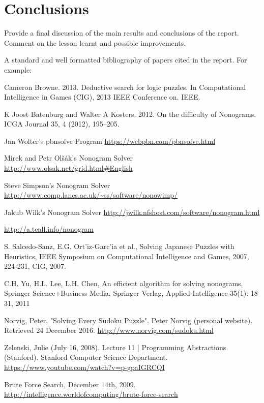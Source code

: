 \documentclass{svproc}
\begin{document}
\section{Conclusions}
Provide a final discussion of the main results and conclusions of the report. Comment on the lesson learnt and possible improvements.

A standard and well formatted bibliography of papers cited in the report. For example:

\begin{thebibliography}{6}

Cameron Browne. 2013. Deductive search for logic puzzles. In Computational
Intelligence in Games (CIG), 2013 IEEE Conference on. IEEE.

K Joost Batenburg and Walter A Kosters. 2012. On the difficulty of Nonograms.
ICGA Journal 35, 4 (2012), 195–205.

Jan Wolter's pbnsolve Program
\url{https://webpbn.com/pbnsolve.html}

Mirek and Petr Olšák's Nonogram Solver
\url{http://www.olsak.net/grid.html#English}

Steve Simpson's Nonogram Solver
\url{http://www.comp.lancs.ac.uk/~ss/software/nonowimp/}

Jakub Wilk's Nonogram Solver
\url{http://jwilk.nfshost.com/software/nonogram.html}

\url{http://a.teall.info/nonogram}

S. Salcedo-Sanz, E.G. Ort’iz-Garc’ia et al., Solving Japanese Puzzles with
Heuristics, IEEE Symposium on Computational Intelligence and Games,
2007, 224-231, CIG, 2007.

C.H. Yu, H.L. Lee, L.H. Chen, An efficient algorithm for solving nonograms, Springer Science+Business Media, Springer Verlag, Applied Intelligence 35(1): 18-31, 2011

Norvig, Peter. "Solving Every Sudoku Puzzle". Peter Norvig (personal website). Retrieved 24 December 2016.
\url{http://www.norvig.com/sudoku.html}

Zelenski, Julie (July 16, 2008). Lecture 11 | Programming Abstractions (Stanford). Stanford Computer Science Department.
\url{https://www.youtube.com/watch?v=p-gpaIGRCQI}

Brute Force Search, December 14th, 2009.
\url{http://intelligence.worldofcomputing/brute-force-search}


\end{thebibliography}
\end{document}
